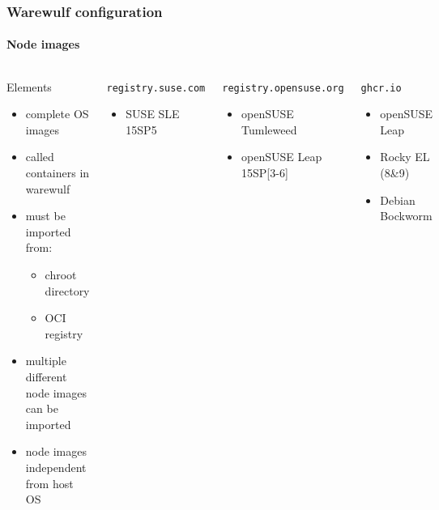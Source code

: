 \documentclass[aspectratio=169]{beamer}
\begin{document}
\begin{frame}[fragile]
\frametitle{Warewulf configuration}
\framesubtitle{Node images}
\begin{columns}
\begin{block}{Elements}
\begin{itemize}
  \item complete OS images
  \item called containers in warewulf
  \item must be imported from:
  \begin{itemize}
    \item chroot directory
    \item OCI registry
  \end{itemize}
  \item multiple different node images can be imported
  \item node images independent from host OS
\end{itemize}
\end{block}
\begin{block}{\texttt{registry.suse.com}}
  \begin{itemize}
    \item SUSE SLE 15SP5
  \end{itemize}
\end{block}
\begin{block}{\texttt{registry.opensuse.org}}
  \begin{itemize}
    \item openSUSE Tumleweed
    \item openSUSE Leap 15SP[3-6]
   \end{itemize}
\end{block}
\begin{block}{\texttt{ghcr.io}}
  \begin{itemize}
    \item openSUSE Leap
    \item Rocky EL (8\&9)
    \item Debian Bockworm
  \end{itemize}
\end{block}
\column{2cm}
\end{columns}
\end{frame}
\end{document}
